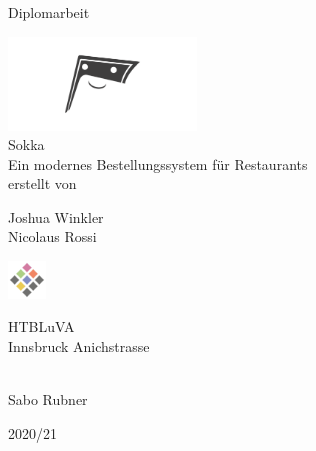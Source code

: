 \begin{titlepage}
	\begin{center}
		\Large{Diplomarbeit} \\
		
		\bigskip
		\bigskip
		\bigskip

		\includegraphics[width=5cm]{../images/sokka.png} \\
		\Huge{Sokka} \\
		\bigskip
		\bigskip
		\bigskip
		\huge{Ein modernes Bestellungssystem für Restaurants} \\

		\bigskip
		\bigskip
		\bigskip
		\large{erstellt von} \\

		\bigskip
		\bigskip
		\bigskip
		
		\Huge{Joshua Winkler} \\
		\Huge{Nicolaus Rossi} \\
		\bigskip
		\bigskip
		\bigskip

		
		\bigskip
	    \bigskip
        
        \includegraphics[width=1cm]{../images/htl-logo}

		\Large{HTBLuVA} \\
		\Large{Innsbruck Anichstrasse} \\

		\bigskip		
		\bigskip
		\bigskip

		 \\
		Sabo Rubner

		\bigskip
		\bigskip
		\bigskip
		\bigskip
		
		\Large{2020/21}

	\end{center}
 
\end{titlepage}